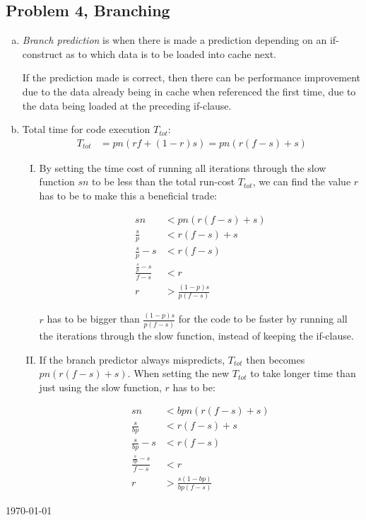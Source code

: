 \documentclass[fontsize=11pt, paper=a4, titlepage]{article}
\begin{document}
\subsection{Problem 4, Branching}
\begin{enumerate}[a)]

    \item \textit{Branch prediction} is when there is made a prediction
depending on an if-construct as to which data is to be loaded into cache next.

If the prediction made is correct, then there can be performance improvement due
to the data already being in cache when referenced the first time, due to the
data being loaded at the preceding if-clause.

    \item Total time for code execution $T_{tot}$:
    \begin{align*}
        T_{tot} &= pn(rf + (1-r)s) = pn(r(f-s) + s)
    \end{align*}

    \begin{enumerate}[I)]

        \item By setting the time cost of running all iterations through the
slow function $sn$ to be less than the total run-cost $T_{tot}$, we can find the value $r$ has to be to make this a beneficial trade:

        \begin{align*}
            sn &< pn(r(f-s) + s) \\
            \frac{s}{p} &< r(f-s) + s \\
            \frac{s}{p} - s &< r(f-s) \\
            \frac{\frac{s}{p} - s}{f-s} &< r \\
            r &> \frac{(1-p)s}{p(f-s)}
        \end{align*}

    $r$ has to be bigger than $\frac{(1-p)s}{p(f-s)}$ for the code to be faster
by running all the iterations through the slow function, instead of keeping the
if-clause.

    \item If the branch predictor always mispredicts, $T_{tot}$ then becomes
$pn(r(f-s) + s)$. When setting the new $T_{tot}$ to take longer time than just using the slow function, $r$ has to be:

        \begin{align*}
            sn &< bpn(r(f-s) + s) \\
            \frac{s}{bp} &< r(f-s) + s \\
            \frac{s}{bp} - s &< r(f-s) \\
            \frac{\frac{s}{bp} - s}{f-s} &< r \\
            r &> \frac{s(1-bp)}{bp(f-s)}
        \end{align*}

    \end{enumerate}

\end{enumerate}

\vfill
\hfill \large{\today}
\end{document}
